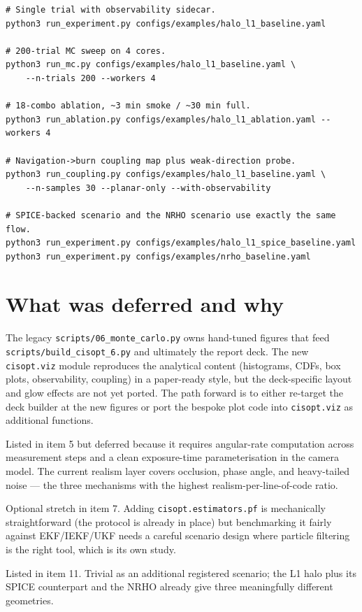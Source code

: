 \documentclass[11pt]{article}
\begin{document}
\begin{lstlisting}[language=shell]
# Single trial with observability sidecar.
python3 run_experiment.py configs/examples/halo_l1_baseline.yaml

# 200-trial MC sweep on 4 cores.
python3 run_mc.py configs/examples/halo_l1_baseline.yaml \
    --n-trials 200 --workers 4

# 18-combo ablation, ~3 min smoke / ~30 min full.
python3 run_ablation.py configs/examples/halo_l1_ablation.yaml --workers 4

# Navigation->burn coupling map plus weak-direction probe.
python3 run_coupling.py configs/examples/halo_l1_baseline.yaml \
    --n-samples 30 --planar-only --with-observability

# SPICE-backed scenario and the NRHO scenario use exactly the same flow.
python3 run_experiment.py configs/examples/halo_l1_spice_baseline.yaml
python3 run_experiment.py configs/examples/nrho_baseline.yaml
\end{lstlisting}

\section{What was deferred and why}

\begin{description}[leftmargin=2em,style=nextline]
\item[Item 10 (full deck plotting migration)]
The legacy \texttt{scripts/06\_monte\_carlo.py} owns hand-tuned figures
that feed \texttt{scripts/build\_cisopt\_6.py} and ultimately the
report deck. The new \texttt{cisopt.viz} module reproduces the
analytical content (histograms, CDFs, box plots, observability,
coupling) in a paper-ready style, but the deck-specific layout and
glow effects are not yet ported. The path forward is to either
re-target the deck builder at the new figures or port the bespoke
plot code into \texttt{cisopt.viz} as additional functions.

\item[Motion blur]
Listed in item 5 but deferred because it requires angular-rate
computation across measurement steps and a clean exposure-time
parameterisation in the camera model. The current realism layer
covers occlusion, phase angle, and heavy-tailed noise --- the three
mechanisms with the highest realism-per-line-of-code ratio.

\item[Particle filter]
Optional stretch in item 7. Adding \texttt{cisopt.estimators.pf} is
mechanically straightforward (the protocol is already in place) but
benchmarking it fairly against EKF/IEKF/UKF needs a careful scenario
design where particle filtering is the right tool, which is its own
study.

\item[Bad-observability scenario]
Listed in item 11. Trivial as an additional registered scenario;
the L1 halo plus its SPICE counterpart and the NRHO already give
three meaningfully different geometries.
\end{description}
\end{document}

